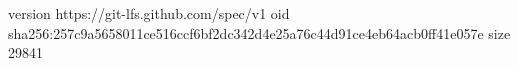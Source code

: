 version https://git-lfs.github.com/spec/v1
oid sha256:257c9a5658011ce516ccf6bf2dc342d4e25a76c44d91ce4eb64acb0ff41e057e
size 29841
